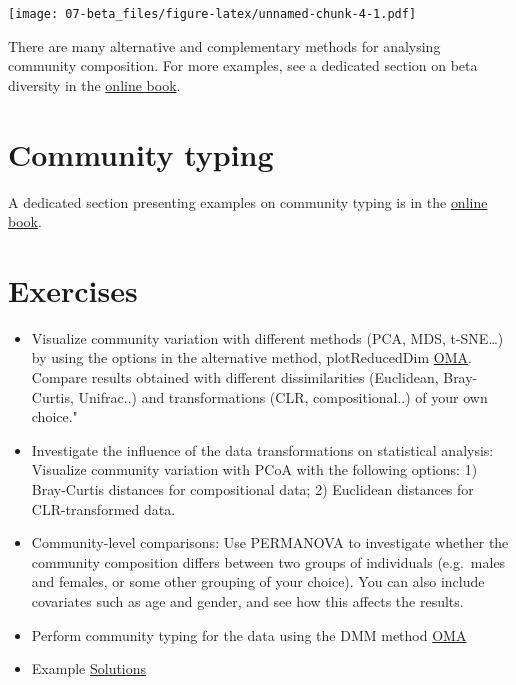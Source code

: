 \documentclass[
  oneside]{book}
\begin{document}
\texttt{[image: 07-beta\_files/figure-latex/unnamed-chunk-4-1.pdf]}

There are many alternative and complementary methods for analysing
community composition. For more examples, see a dedicated section on
beta diversity in the \href{https://microbiome.github.io/OMA/microbiome-diversity.html\#beta-diversity}{online
book}.

\hypertarget{community-typing}{%
\section{Community typing}\label{community-typing}}

A dedicated section presenting examples on community typing is in the
\href{https://microbiome.github.io/OMA/microbiome-community.html\#community-typing}{online book}.

\hypertarget{exercises-1}{%
\section{Exercises}\label{exercises-1}}

\begin{itemize}
\item
  Visualize community variation with different methods (PCA, MDS, t-SNE\ldots) by using the options in the alternative method, plotReducedDim \href{https://microbiome.github.io/OMA/microbiome-diversity.html\#estimating-beta-diversity}{OMA}. Compare results obtained with different dissimilarities (Euclidean, Bray-Curtis, Unifrac..) and transformations (CLR, compositional..) of your own choice."
\item
  Investigate the influence of the data transformations on
  statistical analysis: Visualize community variation with PCoA with
  the following options: 1) Bray-Curtis distances for compositional
  data; 2) Euclidean distances for CLR-transformed data.
\item
  Community-level comparisons: Use PERMANOVA to investigate whether
  the community composition differs between two groups of individuals
  (e.g.~males and females, or some other grouping of your
  choice). You can also include covariates such as age and gender,
  and see how this affects the results.
\item
  Perform community typing for the data using the DMM method \href{https://microbiome.github.io/OMA/microbiome-community.html\#community-typing}{OMA}
\item
  Example \href{08-5-ex-sol-ADHD.html}{Solutions}
\end{itemize}
\end{document}
